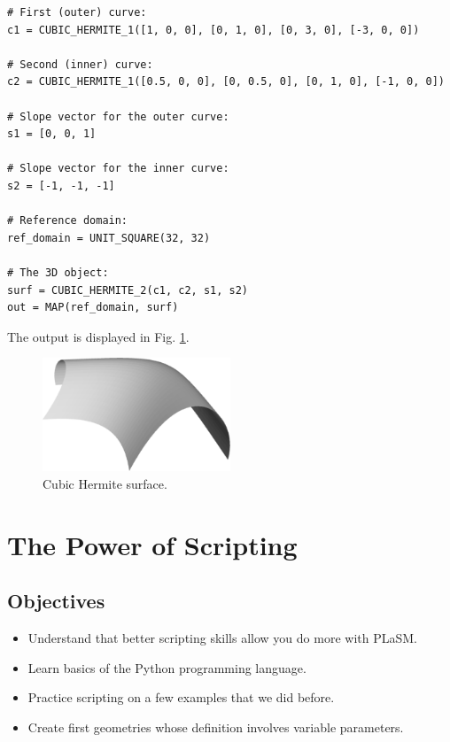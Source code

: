 \begin{bbox}
\begin{verbatim}
# First (outer) curve:
c1 = CUBIC_HERMITE_1([1, 0, 0], [0, 1, 0], [0, 3, 0], [-3, 0, 0])

# Second (inner) curve:
c2 = CUBIC_HERMITE_1([0.5, 0, 0], [0, 0.5, 0], [0, 1, 0], [-1, 0, 0])

# Slope vector for the outer curve:
s1 = [0, 0, 1]

# Slope vector for the inner curve:
s2 = [-1, -1, -1]

# Reference domain:
ref_domain = UNIT_SQUARE(32, 32)

# The 3D object:
surf = CUBIC_HERMITE_2(c1, c2, s1, s2)
out = MAP(ref_domain, surf)
\end{verbatim}
\end{bbox}
\vspace{6mm}

\noindent
The output is displayed in Fig. \ref{fig:curves-14}.\\

\begin{figure}[!ht]
\begin{center}
\includegraphics[width=0.5\textwidth]{img/curves-14.png}
\end{center}
\vspace{-4mm}
\caption{Cubic Hermite surface.}
\label{fig:curves-14}
\end{figure}
\noindent


\section{The Power of Scripting}

\subsection{Objectives}
\begin{itemize}
\item Understand that better scripting skills allow you do more with PLaSM.
\item Learn basics of the Python programming language.
\item Practice scripting on a few examples that we did before.
\item Create first geometries whose definition involves variable parameters.
\end{itemize}

